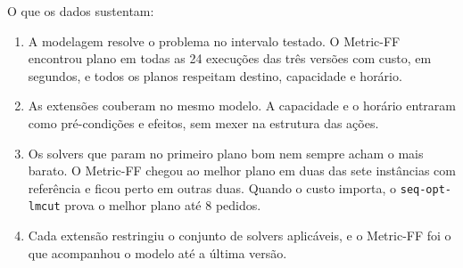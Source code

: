 \documentclass[11pt,a4paper]{article}
\newcommand{\cod}[1]{\texttt{#1}}
\begin{document}
O que os dados sustentam:

\begin{enumerate}
\item A modelagem resolve o problema no intervalo testado. O Metric-FF encontrou plano em todas as 24 execuções das três versões com custo, em segundos, e todos os planos respeitam destino, capacidade e horário.
\item As extensões couberam no mesmo modelo. A capacidade e o horário entraram como pré-condições e efeitos, sem mexer na estrutura das ações.
\item Os solvers que param no primeiro plano bom nem sempre acham o mais barato. O Metric-FF chegou ao melhor plano em duas das sete instâncias com referência e ficou perto em outras duas. Quando o custo importa, o \cod{seq-opt-lmcut} prova o melhor plano até 8 pedidos.
\item Cada extensão restringiu o conjunto de solvers aplicáveis, e o Metric-FF foi o que acompanhou o modelo até a última versão.
\end{enumerate}
\end{document}
